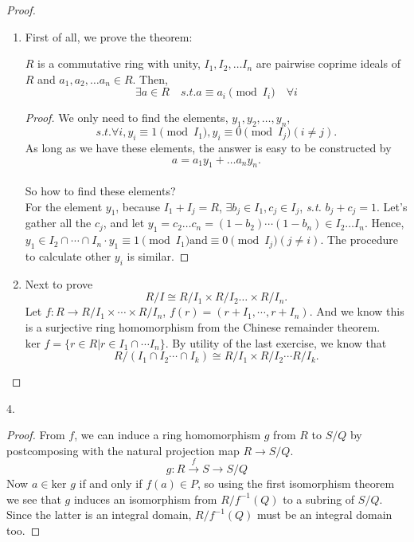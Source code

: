 \begin{proof}
    \begin{enumerate}[(1)]
        \item First of all, we prove the theorem: 
        \begin{theorem}
            $R$ is a commutative ring with unity, $I_1,I_2,\dots I_n$ are pairwise coprime ideals of $R$ and $a_1,a_2,\dots a_n\in R$. Then, $$\exists a\in R\quad \textit{s.t.} a\equiv a_i \pmod{I_i}\quad \forall i$$
        \end{theorem}
        \begin{proof}
            We only need to find the elements, $y_1,y_2,\dots,y_n$, 
            $$ \textit{s.t.} \forall i, y_i \equiv 1 \pmod{I_1}, y_i\equiv 0 \pmod{I_j} (i\neq j). $$
            As long as we have these elements, the answer is easy to be constructed by $$a=a_1y_1+\dots a_ny_n.$$\\
            So how to find these elements?\\
            For the element $y_1$, because $I_1+I_j=R$, $\exists b_j\in I_1,c_j\in I_j$, \textit{s.t.} $b_j+c_j=1$. Let's gather all the $c_j$, and let $y_1=c_2\dots c_n=(1-b_2)\cdots (1-b_n)\in I_2\dots I_n$. Hence, $y_1\in I_2 \cap \cdots \cap I_n \cdot y_1\equiv 1 \pmod{I_1} \text{and} \equiv 0 \pmod{I_j} (j\neq i)$. The procedure to calculate other $y_i$ is similar.
        \end{proof}
        \item Next to prove $$R/I\cong R/I_1\times R/I_2  \dots \times R/I_n.$$
        Let $f:R\rightarrow R/I_1\times \cdots \times R/I_n$, $f(r)=(r+I_1, \cdots, r+I_n)$. And we know this is a surjective ring homomorphism from the Chinese remainder theorem. $\textrm{ker } f=\{r\in R | r\in I_1 \cap \cdots I_n\}.$ By utility of the last exercise, we know that 
        $$R/(I_1\cap I_2 \cdots \cap I_k)\cong R/I_1 \times R/I_2 \cdots R/I_k.$$
    \end{enumerate}
\end{proof}

\begin{exercise}
    4.
\end{exercise}

\begin{proof}
    From $f$, we can induce a ring homomorphism $g$ from $R$ to $S/Q$ by postcomposing with the natural projection map $R \rightarrow S/Q$.
    $$g: R \overset{f}{\rightarrow} S\rightarrow S/Q $$
    Now $a\in \textrm{ker } g$ if and
only if $f(a) \in P$, so using the first isomorphism theorem we see that $g$ induces an
isomorphism from $R/f^{-1}(Q)$ to a subring of $S/Q$. Since the latter is an integral domain, $R/f^{-1}(Q)$ must be an integral domain too.
\end{proof}

